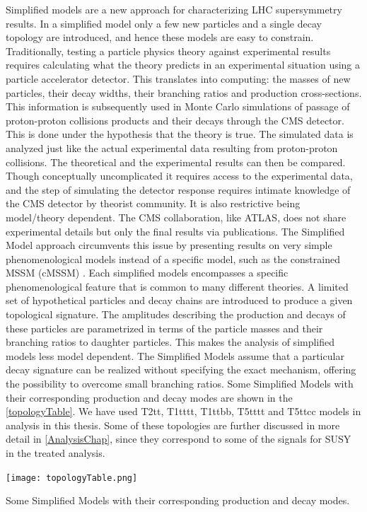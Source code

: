 Simplified models \cite{SSM} are a new approach for characterizing LHC supersymmetry results. In a simplified model only a few new particles and a single decay topology are introduced, and hence these models are easy to constrain. Traditionally, testing a particle physics theory against experimental results requires calculating what the theory predicts in an experimental situation using a particle accelerator detector. This translates into computing: the masses of new particles, their decay widths, their branching ratios and production cross-sections. This information is subsequently used in Monte Carlo simulations of passage of proton-proton collisions products and their decays through the CMS detector. This is done under the hypothesis that the theory is true. The simulated data is  analyzed just like the actual experimental data resulting from proton-proton collisions. The theoretical and the experimental results can then be compared. Though conceptually uncomplicated it requires access to the experimental data, and the step of simulating the detector response requires intimate knowledge of the CMS detector by theorist community. It is also restrictive being model/theory dependent. The CMS collaboration, like ATLAS, does not share experimental details but only the final results via publications. The Simplified Model approach circumvents this issue by presenting results on very simple phenomenological models instead of a specific model, such as the constrained MSSM (cMSSM) \cite{cMSSM}. Each simplified models encompasses a specific phenomenological feature that is common to many different theories. A limited set of hypothetical particles and decay chains are introduced to produce a given topological signature. The amplitudes describing the production and decays of these particles are parametrized in terms of the particle masses and their branching ratios to daughter particles. This makes the analysis of simplified models less model dependent. The Simplified Models assume that a particular decay signature can be realized without specifying the exact mechanism, offering the possibility to overcome small branching ratios. Some Simplified Models with their corresponding production and decay modes are shown in the \autoref{topologyTable}. We have used T2tt, T1tttt, T1ttbb, T5tttt and T5ttcc models in analysis in this thesis. Some of these topologies are further discussed in more detail in \autoref{AnalysisChap}, since they correspond to some of the signals for SUSY in the treated analysis.

\begin{table}[H]
\begin{center}
\texttt{[image: topologyTable.png]}
\caption{Some Simplified Models with their corresponding production and decay modes.}
\label{topologyTable}
\end{center}
\end{table}


